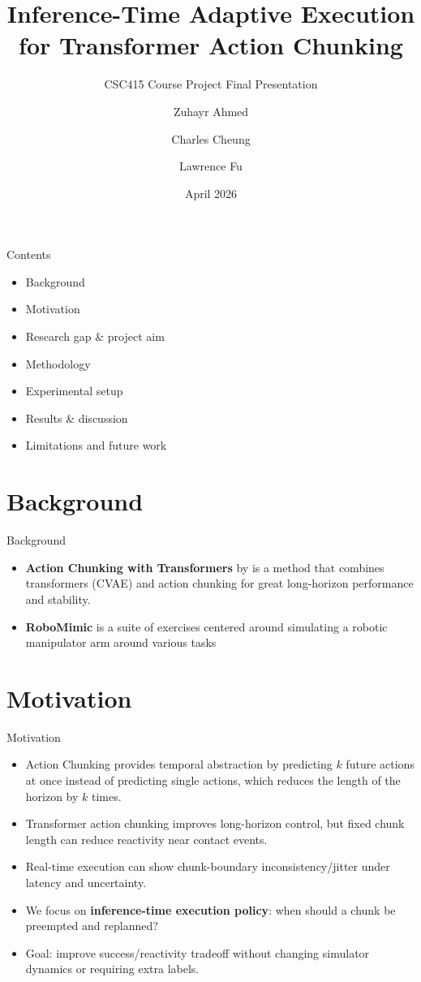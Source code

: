 \documentclass[aspectratio=169]{beamer}
\title[Adaptive Chunk Execution]{Inference-Time Adaptive Execution for Transformer Action Chunking}
\subtitle{CSC415 Course Project Final Presentation}
\author{Zuhayr Ahmed \and Charles Cheung \and Lawrence Fu}
\institute[]{CSC415: Introduction to Reinforcement Learning}
\date{April 2026}
\begin{document}
{
\frame{\titlepage}
}

\begin{frame}{Contents}
    \begin{itemize}
        \item Background
        \item Motivation
        \item Research gap \& project aim
        \item Methodology
        \item Experimental setup
        \item Results \& discussion
        \item Limitations and future work
    \end{itemize}
\end{frame}

\section{Background}
\begin{frame}{Background}
    \begin{itemize}
        \item \textbf{Action Chunking with Transformers} by \cite{zhao2023} is a method that combines transformers (CVAE) and action chunking for great long-horizon performance and stability.
        \item \textbf{RoboMimic} is a suite of exercises centered around simulating a robotic manipulator arm around various tasks
    \end{itemize}
\end{frame}

\section{Motivation}
\begin{frame}{Motivation}
    \begin{itemize}
        \item Action Chunking provides temporal abstraction by predicting $k$ future actions at
once instead of predicting single actions, which reduces the length of the horizon by $k$ times.
        \item Transformer action chunking improves long-horizon control, but fixed chunk length can reduce reactivity near contact events.
        \item Real-time execution can show chunk-boundary inconsistency/jitter under latency and uncertainty.
        \item We focus on \textbf{inference-time execution policy}: when should a chunk be preempted and replanned?
        \item Goal: improve success/reactivity tradeoff without changing simulator dynamics or requiring extra labels.
    \end{itemize}
\end{frame}
\end{document}
